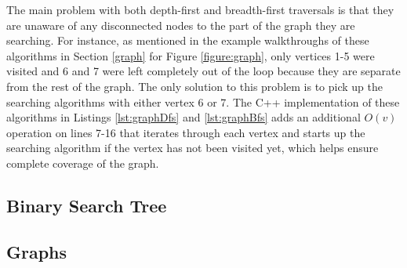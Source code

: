 \documentclass[letterpaper, 10pt,DIV=13]{scrartcl}
\numberwithin{equation}{section} %
\numberwithin{figure}{section} %
\numberwithin{table}{section} %
\begin{document}
The main problem with both depth-first and breadth-first traversals is that they are unaware of any disconnected nodes to the part of the graph they are searching. For instance, as mentioned in the example walkthroughs of these algorithms in Section \ref{graph} for Figure \ref{figure:graph}, only vertices 1-5 were visited and 6 and 7 were left completely out of the loop because they are separate from the rest of the graph. The only solution to this problem is to pick up the searching algorithms with either vertex 6 or 7. The C++ implementation of these algorithms in Listings \ref{lst:graphDfs} and \ref{lst:graphBfs} adds an additional $O(v)$ operation on lines 7-16 that iterates through each vertex and starts up the searching algorithm if the vertex has not been visited yet, which helps ensure complete coverage of the graph.


\lstset{numbers=left, numberstyle=\tiny, stepnumber=1, numbersep=5pt}


\subsection{Binary Search Tree}


\subsection{Graphs}



\end{document}
